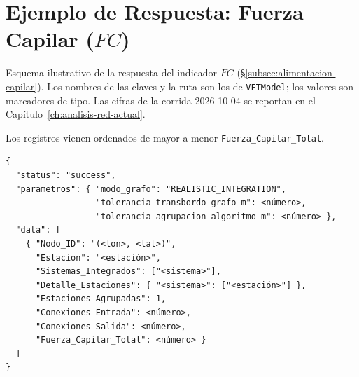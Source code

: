 
\section{Ejemplo de Respuesta: Fuerza Capilar \texorpdfstring{($FC$)}{(FC)}}
\label{anx:vft-out-capilar}

Esquema ilustrativo de la respuesta del indicador $FC$
(§\ref{subsec:alimentacion-capilar}). Los nombres de las claves y la ruta son los
de \texttt{VFTModel}; los valores son marcadores de tipo. Las cifras de la
corrida 2026-10-04 se reportan en el Capítulo~\ref{ch:analisis-red-actual}.

Los registros vienen ordenados de mayor a menor \texttt{Fuerza\_Capilar\_Total}.

\begin{lstlisting}[style=estiloPython,
  caption={Esquema de respuesta del endpoint
           \texttt{/topological/capillary-strength} (ilustrativo).},
  label=lst:out-capilar]
{
  "status": "success",
  "parametros": { "modo_grafo": "REALISTIC_INTEGRATION",
                  "tolerancia_transbordo_grafo_m": <número>,
                  "tolerancia_agrupacion_algoritmo_m": <número> },
  "data": [
    { "Nodo_ID": "(<lon>, <lat>)",
      "Estacion": "<estación>",
      "Sistemas_Integrados": ["<sistema>"],
      "Detalle_Estaciones": { "<sistema>": ["<estación>"] },
      "Estaciones_Agrupadas": 1,
      "Conexiones_Entrada": <número>,
      "Conexiones_Salida": <número>,
      "Fuerza_Capilar_Total": <número> }
  ]
}
\end{lstlisting}
